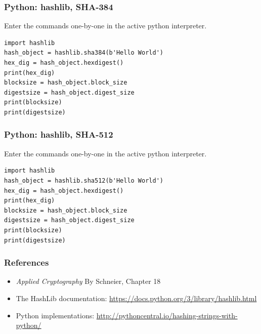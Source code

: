\documentclass{beamer}
\newcommand{\<}{\langle}
\renewcommand{\>}{\rangle}
\begin{document}
\begin{frame}[fragile]
\frametitle{Python: hashlib, SHA-384}
 Enter the commands one-by-one in the active python interpreter. 
\begin{verbatim}
import hashlib
hash_object = hashlib.sha384(b'Hello World')
hex_dig = hash_object.hexdigest()
print(hex_dig)
blocksize = hash_object.block_size
digestsize = hash_object.digest_size
print(blocksize)
print(digestsize)
\end{verbatim}
\end{frame}

\begin{frame}[fragile]
\frametitle{Python: hashlib, SHA-512}
 Enter the commands one-by-one in the active python interpreter. 
\begin{verbatim}
import hashlib
hash_object = hashlib.sha512(b'Hello World')
hex_dig = hash_object.hexdigest()
print(hex_dig)
blocksize = hash_object.block_size
digestsize = hash_object.digest_size
print(blocksize)
print(digestsize)
\end{verbatim}
\end{frame}


\begin{frame}
\frametitle{References}

\begin{itemize}
\item \emph{Applied Cryptography} By Schneier, Chapter 18
\item The HashLib documentation: \url{https://docs.python.org/3/library/hashlib.html}
\item Python implementations: \url{http://pythoncentral.io/hashing-strings-with-python/}
\end{itemize}
\end{frame}
\end{document}
